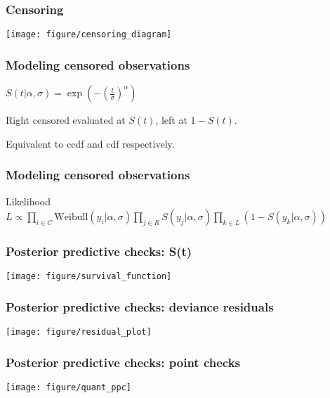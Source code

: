 \documentclass{beamer}
\begin{document}
\begin{frame}
  \frametitle{Censoring}
  \begin{center}
    \texttt{[image: figure/censoring\_diagram]}
  \end{center}
\end{frame}

\begin{frame}
  \frametitle{Modeling censored observations}
  \begin{definition}
    \(S(t | \alpha, \sigma) = \exp\left(-\left(\frac{t}{\sigma}\right)^{\alpha}\right)\)
  \end{definition}

  Right censored evaluated at \(S(t)\), left at \(1 - S(t)\). 
  
  Equivalent to ccdf and cdf respectively.
\end{frame}

\begin{frame}
  \frametitle{Modeling censored observations}
  \begin{block}{Likelihood}
    \(L \propto \prod_{i \in C} \mathrm{Weibull}(y_{i} | \alpha, \sigma) \prod_{j \in R} S(y_j | \alpha, \sigma) \prod_{k \in L} \left(1 - S(y_{k} | \alpha, \sigma)\right)\)
  \end{block}

\end{frame}

\begin{frame}
  \frametitle{Posterior predictive checks: S(t)}
  \begin{center}
    \texttt{[image: figure/survival\_function]}
  \end{center}
\end{frame}

\begin{frame}
  \frametitle{Posterior predictive checks: deviance residuals}
  \begin{center}
    \texttt{[image: figure/residual\_plot]}
  \end{center}
\end{frame}

\begin{frame}
  \frametitle{Posterior predictive checks: point checks}
  \begin{center}
    \texttt{[image: figure/quant\_ppc]}
  \end{center}
\end{frame}
\end{document}
